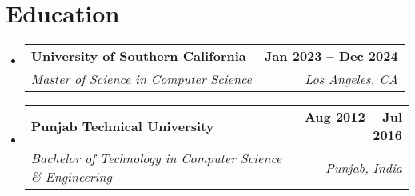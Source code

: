 \documentclass[letterpaper,10pt]{article}
\makeatletter
\newcommand{\resumeSubheading}[4]{
  \vspace{-2pt}\item
    \begin{tabular*}{1.0\textwidth}[t]{l@{\extracolsep{\fill}}r}
      \textbf{#1} & \textbf{\small #2} \\
      \textit{\small#3} & \textit{\small #4} \\
    \end{tabular*}\vspace{-7pt}
}
\newcommand{\resumeSubHeadingListStart}{\begin{itemize}[leftmargin=0.15in, label={}]}
\newcommand{\resumeSubHeadingListEnd}{\end{itemize}}
\makeatother
\begin{document}
\section{Education}
\resumeSubHeadingListStart
  \resumeSubheading
    {University of Southern California}{Jan 2023 -- Dec 2024}
    {Master of Science in Computer Science}{Los Angeles, CA}
\vspace{-5pt}
  \resumeSubheading
    {Punjab Technical University}{Aug 2012 -- Jul 2016}
    {Bachelor of Technology in Computer Science \& Engineering}{Punjab, India}
\resumeSubHeadingListEnd
\vspace{0pt}
\end{document}
